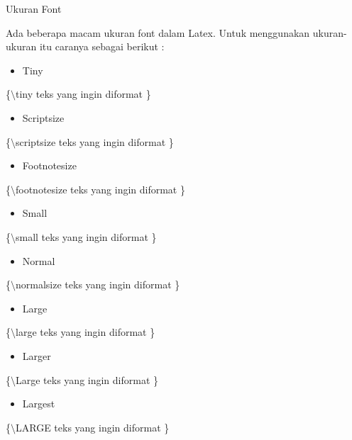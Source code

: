Ukuran Font

Ada beberapa macam ukuran font dalam Latex. Untuk menggunakan 
ukuran-ukuran itu caranya sebagai berikut :

\begin{itemize}
\item Tiny
\end{itemize}
\hspace{0,5in}\{$\setminus$tiny teks yang ingin diformat \}

\begin{itemize}
\item Scriptsize
\end{itemize}
\hspace{0,5in}\{$\setminus$scriptsize teks yang ingin diformat \}

\begin{itemize}
\item Footnotesize
\end{itemize}
\hspace{0,5in}\{$\setminus$footnotesize teks yang ingin diformat \}

\begin{itemize}
\item Small
\end{itemize}
\hspace{0,5in}\{$\setminus$small teks yang ingin diformat \}

\begin{itemize}
\item Normal
\end{itemize}
\hspace{0,5in}\{$\setminus$normalsize teks yang ingin diformat \}

\begin{itemize}
\item Large
\end{itemize}
\hspace{0,5in}\{$\setminus$large teks yang ingin diformat \}

\begin{itemize}
\item Larger
\end{itemize}
\hspace{0,5in}\{$\setminus$Large teks yang ingin diformat \}

\begin{itemize}
\item Largest
\end{itemize}
\hspace{0,5in}\{$\setminus$LARGE teks yang ingin diformat \}

